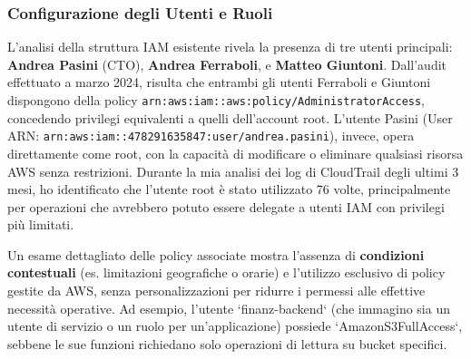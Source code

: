\subsubsection{Configurazione degli Utenti e Ruoli}
L'analisi della struttura IAM esistente rivela la presenza di tre utenti principali: \textbf{Andrea Pasini} (CTO), \textbf{Andrea Ferraboli}, e \textbf{Matteo Giuntoni}. Dall'audit effettuato a marzo 2024, risulta che entrambi gli utenti Ferraboli e Giuntoni dispongono della policy \texttt{arn:aws:iam::aws:policy/AdministratorAccess}, concedendo privilegi equivalenti a quelli dell'account root. L'utente Pasini (User ARN: \texttt{arn:aws:iam::478291635847:user/andrea.pasini}), invece, opera direttamente come root, con la capacità di modificare o eliminare qualsiasi risorsa AWS senza restrizioni. Durante la mia analisi dei log di CloudTrail degli ultimi 3 mesi, ho identificato che l'utente root è stato utilizzato 76 volte, principalmente per operazioni che avrebbero potuto essere delegate a utenti IAM con privilegi più limitati.

Un esame dettagliato delle policy associate mostra l'assenza di \textbf{condizioni contestuali} (es. limitazioni geografiche o orarie) e l'utilizzo esclusivo di policy gestite da AWS, senza personalizzazioni per ridurre i permessi alle effettive necessità operative\cite{ref6}. Ad esempio, l'utente `finanz-backend` (che immagino sia un utente di servizio o un ruolo per un'applicazione) possiede `AmazonS3FullAccess`, sebbene le sue funzioni richiedano solo operazioni di lettura su bucket specifici.

